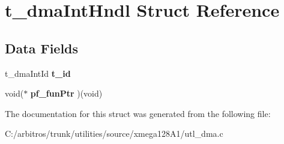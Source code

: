 \hypertarget{structt__dma_int_hndl}{\section{t\-\_\-dma\-Int\-Hndl Struct Reference}
\label{structt__dma_int_hndl}
}
\subsection*{Data Fields}
\begin{DoxyCompactItemize}
\item 
\hypertarget{structt__dma_int_hndl_aba2415da30bb74bec16092696335fd7d}{t\-\_\-dma\-Int\-Id {\bfseries t\-\_\-id}}\label{structt__dma_int_hndl_aba2415da30bb74bec16092696335fd7d}

\item 
\hypertarget{structt__dma_int_hndl_aeccc606c34776ed0934b58b6af7ebec7}{void($\ast$ {\bfseries pf\-\_\-fun\-Ptr} )(void)}\label{structt__dma_int_hndl_aeccc606c34776ed0934b58b6af7ebec7}

\end{DoxyCompactItemize}


The documentation for this struct was generated from the following file\-:\begin{DoxyCompactItemize}
\item 
C\-:/arbitros/trunk/utilities/source/xmega128\-A1/utl\-\_\-dma.\-c\end{DoxyCompactItemize}
